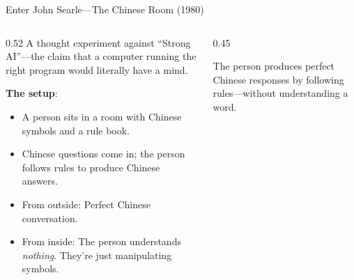 ﻿\documentclass[aspectratio=169,11pt]{beamer}
\begin{document}
\begin{frame}{Enter John Searle---The Chinese Room (1980)}
\begin{columns}[T]
\begin{column}{0.52\textwidth}
A thought experiment against ``Strong AI''---the claim that a computer running the right program would literally have a mind.

\vspace{0.3em}
\textbf{The setup}:
\begin{itemize}
    \item A person sits in a room with Chinese symbols and a rule book.
    \item Chinese questions come in; the person follows rules to produce Chinese answers.
    \item From outside: Perfect Chinese conversation.
    \item From inside: The person understands \emph{nothing}. They're just manipulating symbols.
\end{itemize}
\end{column}
\begin{column}{0.45\textwidth}
\begin{center}
\end{center}

\vspace{0.2em}
{\scriptsize The person produces perfect Chinese responses by following rules---without understanding a word.}
\end{column}
\end{columns}
\end{frame}
\end{document}
